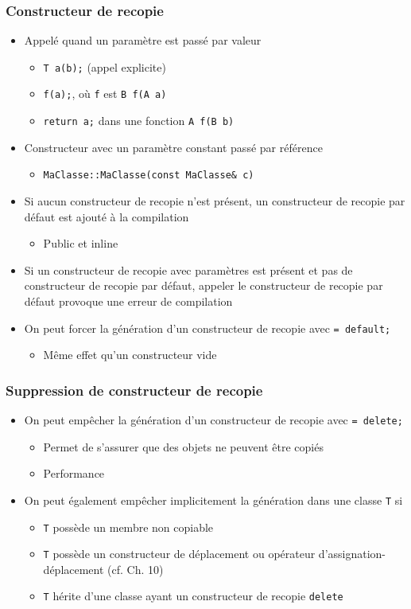 \begin{frame}
\frametitle{Constructeur de recopie}
\begin{itemize}[<+->]
\item Appelé quand un paramètre est passé par valeur
	\begin{itemize}
	\item \texttt{T a(b);} (appel explicite)
	\item \texttt{f(a);}, où \texttt{f} est \lstinline|B f(A a)|
	\item \lstinline|return a;| dans une fonction \lstinline|A f(B b)|
	\end{itemize}
\item Constructeur avec un paramètre constant passé par référence
	\begin{itemize}
	\item \lstinline|MaClasse::MaClasse(const MaClasse& c)|
	\end{itemize}
\item Si aucun constructeur de recopie n'est présent, un constructeur de recopie par défaut est ajouté à la compilation
	\begin{itemize}
	\item Public et inline
	\end{itemize}
\item Si un constructeur de recopie avec paramètres est présent et pas de constructeur de recopie par défaut, appeler le constructeur de recopie par défaut provoque une erreur de compilation
\item On peut forcer la génération d'un constructeur de recopie avec \lstinline|= default;|
	\begin{itemize}
	\item Même effet qu'un constructeur vide
	\end{itemize}
\end{itemize}
\end{frame}

\begin{frame}
\frametitle{Suppression de constructeur de recopie}
\begin{itemize}[<+->]
\item On peut empêcher la génération d'un constructeur de recopie avec \lstinline|= delete;|
	\begin{itemize}
	\item Permet de s'assurer que des objets ne peuvent être copiés
	\item Performance
	\end{itemize}
\item On peut également empêcher implicitement la génération dans une classe \texttt{T} si
	\begin{itemize}
	\item \texttt{T} possède un membre non copiable
	\item \texttt{T} possède un constructeur de déplacement ou opérateur d'assignation-déplacement (cf. Ch. 10)
	\item \texttt{T} hérite d'une classe ayant un constructeur de recopie \lstinline|delete|
	\end{itemize}
\end{itemize}
\end{frame}

